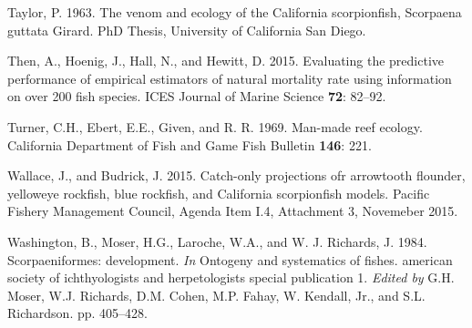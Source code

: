 \documentclass[12pt,]{article}
\begin{document}
\hypertarget{ref-Taylor1963}{}
Taylor, P. 1963. The venom and ecology of the California scorpionfish,
Scorpaena guttata Girard. PhD Thesis, University of California San
Diego.

\hypertarget{ref-Then2015}{}
Then, A., Hoenig, J., Hall, N., and Hewitt, D. 2015. Evaluating the
predictive performance of empirical estimators of natural mortality rate
using information on over 200 fish species. ICES Journal of Marine
Science \textbf{72}: 82--92.

\hypertarget{ref-Turner1969}{}
Turner, C.H., Ebert, E.E., Given, and R. R. 1969. Man-made reef ecology.
California Department of Fish and Game Fish Bulletin \textbf{146}: 221.

\hypertarget{ref-Wallace2015}{}
Wallace, J., and Budrick, J. 2015. Catch-only projections ofr arrowtooth
flounder, yelloweye rockfish, blue rockfish, and California scorpionfish
models. Pacific Fishery Management Council, Agenda Item I.4, Attachment
3, Novemeber 2015.

\hypertarget{ref-Washington1984}{}
Washington, B., Moser, H.G., Laroche, W.A., and W. J. Richards, J. 1984.
Scorpaeniformes: development. \emph{In} Ontogeny and systematics of
fishes. american society of ichthyologists and herpetologists special
publication 1. \emph{Edited by} G.H. Moser, W.J. Richards, D.M. Cohen,
M.P. Fahay, W. Kendall, Jr., and S.L. Richardson. pp. 405--428.
\end{document}
